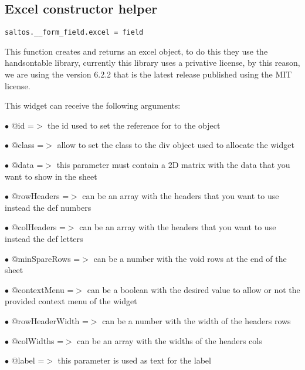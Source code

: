 \documentclass[a4paper]{book}
\begin{document}
\hypertarget{toc396}{}
\subsection{Excel constructor helper}

\begin{lstlisting}
saltos.__form_field.excel = field
\end{lstlisting}

This function creates and returns an excel object, to do this they use the handsontable library,
currently this library uses a privative license, by this reason, we are using the version 6.2.2
that is the latest release published using the MIT license.

This widget can receive the following arguments:

\begin{compactitem}
\item[\color{myblue}$\bullet$] @id             =$>$ the id used to set the reference for to the object
\item[\color{myblue}$\bullet$] @class          =$>$ allow to set the class to the div object used to allocate the widget
\item[\color{myblue}$\bullet$] @data           =$>$ this parameter must contain a 2D matrix with the data that you want to show
                   in the sheet
\item[\color{myblue}$\bullet$] @rowHeaders     =$>$ can be an array with the headers that you want to use instead the def numbers
\item[\color{myblue}$\bullet$] @colHeaders     =$>$ can be an array with the headers that you want to use instead the def letters
\item[\color{myblue}$\bullet$] @minSpareRows   =$>$ can be a number with the void rows at the end of the sheet
\item[\color{myblue}$\bullet$] @contextMenu    =$>$ can be a boolean with the desired value to allow or not the provided
                   context menu of the widget
\item[\color{myblue}$\bullet$] @rowHeaderWidth =$>$ can be a number with the width of the headers rows
\item[\color{myblue}$\bullet$] @colWidths      =$>$ can be an array with the widths of the headers cols
\item[\color{myblue}$\bullet$] @label          =$>$ this parameter is used as text for the label
\end{compactitem}
\end{document}
